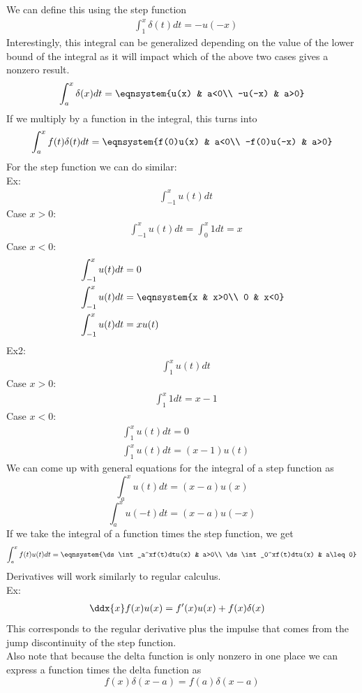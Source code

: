 We can define this using the step function
\begin{align*}
    &\int_1^x\delta(t)dt=-u(-x)
\end{align*}
Interestingly, this integral can be generalized depending on the value of the lower bound of the integral as it will impact which of the above two cases gives a nonzero result.
$$\int_a^x\delta(x)dt=\eqnsystem{u(x) & a<0\\ -u(-x) & a>0}$$
If we multiply by a function in the integral, this turns into
$$\int_a^xf(t)\delta(t)dt=\eqnsystem{f(0)u(x) & a<0\\ -f(0)u(-x) & a>0}$$
For the step function we can do similar:\\
Ex:
\begin{align*}
    &\int_{-1}^xu(t)dt
\end{align*}
Case $x>0$:
\begin{align*}
    &\int_{-1}^xu(t)dt=\int_0^x1dt=x
\end{align*}
Case $x<0$:
\begin{align*}
    &\int_{-1}^xu(t)dt=0\\
    &\int_{-1}^xu(t)dt=\eqnsystem{x & x>0\\ 0 & x<0}\\
    &\int_{-1}^xu(t)dt=xu(t)
\end{align*}
Ex2:
\begin{align*}
    &\int_1^xu(t)dt
\end{align*}
Case $x>0$:
\begin{align*}
    &\int_1^x 1dt=x-1
\end{align*}
Case $x<0$:
\begin{align*}
    &\int_1^x u(t)dt=0\\
    &\int_1^xu(t)dt=(x-1)u(t)
\end{align*}
We can come up with general equations for the integral of a step function as
$$\int_a^x u(t)dt=(x-a)u(x)$$
$$\int_a^x u(-t)dt=(x-a)u(-x)$$
If we take the integral of a function times the step function, we get
$$\int_a^xf(t)u(t)dt=\eqnsystem{\ds\int_a^xf(t)dtu(x) & a>0\\ \ds\int_0^xf(t)dtu(x) & a\leq0}$$
Derivatives will work similarly to regular calculus.\\
Ex:
\begin{align*}
    &\ddx{x}f(x)u(x)=f'(x)u(x)+f(x)\delta(x)
\end{align*}
This corresponds to the regular derivative plus the impulse that comes from the jump discontinuity of the step function.\\
Also note that because the delta function is only nonzero in one place we can express a function times the delta function as
$$f(x)\delta(x-a)=f(a)\delta(x-a)$$

